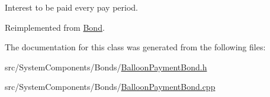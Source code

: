 Interest to be paid every pay period. 

Reimplemented from \mbox{\hyperlink{classBond_a377db8c18b83c4666e46686bc26adef1}{Bond}}.



The documentation for this class was generated from the following files\+:\begin{DoxyCompactItemize}
\item 
src/\+System\+Components/\+Bonds/\mbox{\hyperlink{BalloonPaymentBond_8h}{Balloon\+Payment\+Bond.\+h}}\item 
src/\+System\+Components/\+Bonds/\mbox{\hyperlink{BalloonPaymentBond_8cpp}{Balloon\+Payment\+Bond.\+cpp}}\end{DoxyCompactItemize}

